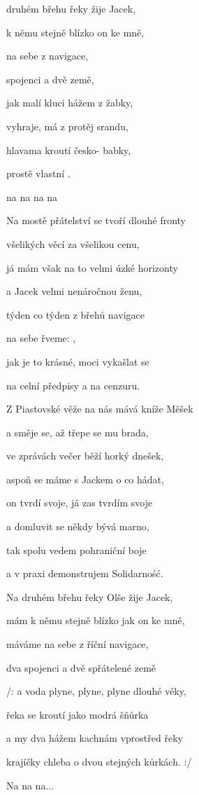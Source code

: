 
\zs
{} druhém břehu řeky  žije Jacek, 

 k němu stejně blízko  on ke mně, 

 na sebe z  navigace, 

 spojenci a dvě  země, 

jak malí kluci hážem z  žabky, 

 vyhraje, má z protěj srandu, 

hlavama kroutí česko- babky, 

 prostě vlastní . 

 na  na  na  na  
\ks

\zs
Na mostě přátelství se tvoří dlouhé fronty 

všelikých věcí za všelikou cenu, 

já mám však na to velmi úzké horizonty 

a Jacek velmi nenáročnou ženu, 

týden co týden z břehů navigace 

na sebe řveme: , 

jak je to krásné, moci vykašlat se 

na celní předpisy a na cenzuru.
\ks

\zs
Z Piastovské věže na nás mává kníže Měšek 

a směje se, až třepe se mu brada, 

ve zprávách večer běží horký dnešek, 

aspoň se máme s Jackem o co hádat, 

on tvrdí svoje, já zas tvrdím svoje 

a domluvit se někdy bývá marno, 

tak spolu vedem pohraniční boje 

a v praxi demonstrujem Solidarno\'s\'c.
\ks

\zs
Na druhém břehu řeky Olše žije Jacek, 

mám k němu stejně blízko jak on ke mně, 

máváme na sebe z říční navigace, 

dva spojenci a dvě spřátelené země 

/: a voda plyne, plyne, plyne dlouhé věky, 

řeka se kroutí jako modrá šňůrka 

a my dva hážem kachnám vprostřed řeky 

krajíčky chleba o dvou stejných kůrkách. :/ 

Na na na...
\ks
\kp





